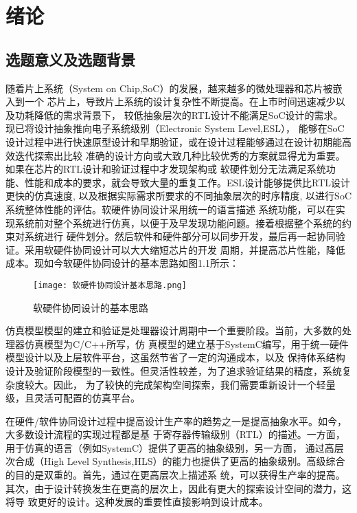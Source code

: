 
\chapter{绪论}

\section{选题意义及选题背景}
随着片上系统（System on Chip,SoC）的发展，越来越多的微处理器和芯片被嵌入到一个
芯片上，导致片上系统的设计复杂性不断提高。在上市时间迅速减少以及功耗降低的需求背景下，
较低抽象层次的RTL设计不能满足SoC设计的需求。现已将设计抽象推向电子系统级别（Electronic System Level,ESL），
能够在SoC设计过程中进行快速原型设计和早期验证\cite{1}，或在设计过程能够通过在设计初期能高效迭代探索出比较
准确的设计方向或大致几种比较优秀的方案就显得尤为重要。如果在芯片的RTL设计和验证过程中才发现架构或
软硬件划分无法满足系统功能、性能和成本的要求，就会导致大量的重复工作。ESL设计能够提供比RTL设计更快的仿真速度,
以及根据实际需求所要求的不同抽象层次的时序精度, 以进行SoC系统整体性能的评估。软硬件协同设计采用统一的语言描述
系统功能，可以在实现系统前对整个系统进行仿真，以便于及早发现功能问题。接着根据整个系统的约束对系统进行
硬件划分。然后软件和硬件部分可以同步开发，最后再一起协同验证。采用软硬件协同设计可以大大缩短芯片的开发
周期，并提高芯片性能，降低成本。现如今软硬件协同设计的基本思路如图1.1所示：
\begin{figure}
    \centering
    \texttt{[image: 软硬件协同设计基本思路.png]}
    \caption{软硬件协同设计的基本思路}
    \label{fig:badge}
\end{figure}

仿真模型模型的建立和验证是处理器设计周期中一个重要阶段。当前，大多数的处理器仿真模型为C/C++所写，仿
真模型的建立基于SystemC\cite{2}编写，用于统一硬件模型设计以及上层软件平台，这虽然节省了一定的沟通成本，以及
保持体系结构设计及验证阶段模型的一致性。但灵活性较差，为了追求验证结果的精度，系统复杂度较大。因此，
为了较快的完成架构空间探索，我们需要重新设计一个轻量级，且灵活可配置的仿真平台。

在硬件/软件协同设计过程\cite{3}中提高设计生产率的趋势之一是提高抽象水平。如今，大多数设计流程的实现过程都是基
于寄存器传输级别（RTL）的描述。一方面，用于仿真的语言（例如SystemC）提供了更高的抽象级别，另一方面，
通过高层次合成（High Level Synthesis,HLS）\cite{4}的能力也提供了更高的抽象级别。高级综合的目的是双重的。首先，通过在更高层次上描述系
统，可以获得生产率的提高。其次，由于设计转换发生在更高的层次上，因此有更大的探索设计空间的潜力，这将导
致更好的设计。这种发展的重要性直接影响到设计成本。

